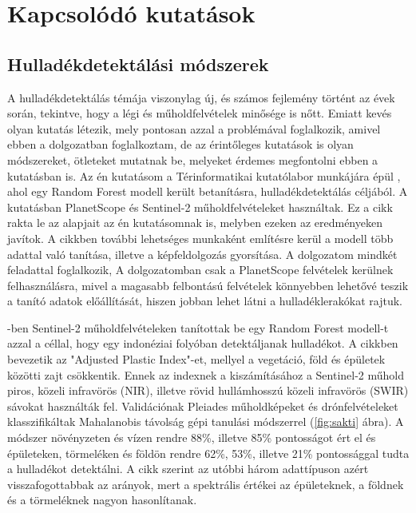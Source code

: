 \chapter{Kapcsolódó kutatások}
\label{ch:related_research}

\section{Hulladékdetektálási módszerek}
\label{ch:waste-detection-methods}

A hulladékdetektálás témája viszonylag új, és számos fejlemény történt az évek során, tekintve, hogy a légi és műholdfelvételek minősége is nőtt. Emiatt kevés olyan kutatás létezik, mely pontosan azzal a problémával foglalkozik, amivel ebben a dolgozatban foglalkoztam, de az érintőleges kutatások is olyan módszereket, ötleteket mutatnak be, melyeket érdemes megfontolni ebben a kutatásban is. Az én kutatásom a Térinformatikai kutatólabor munkájára épül \cite{magyar2023}, ahol egy Random Forest modell került betanításra, hulladékdetektálás céljából. A kutatásban PlanetScope és Sentinel-2 műholdfelvételeket használtak. Ez a cikk rakta le az alapjait az én kutatásomnak is, melyben ezeken az eredményeken javítok. A cikkben további lehetséges munkaként említésre kerül a modell több adattal való tanítása, illetve a képfeldolgozás gyorsítása. A dolgozatom mindkét feladattal foglalkozik, A dolgozatomban csak a PlanetScope felvételek kerülnek felhasználásra, mivel a magasabb felbontású felvételek könnyebben lehetővé teszik a tanító adatok előállítását, hiszen jobban lehet látni a hulladéklerakókat rajtuk.

\cite{sakti2023}-ben Sentinel-2 műholdfelvételeken tanítottak be egy Random Forest modell-t azzal a céllal, hogy egy indonéziai folyóban detektáljanak hulladékot. A cikkben bevezetik az "Adjusted Plastic Index"-et, mellyel a vegetáció, föld és épületek közötti zajt csökkentik. Ennek az indexnek a kiszámításához a Sentinel-2 műhold piros, közeli infravörös (NIR), illetve rövid hullámhosszú közeli infravörös (SWIR) sávokat használták fel. Validációnak Pleiades műholdképeket és drónfelvételeket klasszifikáltak Mahalanobis távolság gépi tanulási módszerrel (\ref{fig:sakti} ábra). A módszer növényzeten és vízen rendre 88\%, illetve 85\% pontosságot ért el és épületeken, törmeléken és földön rendre 62\%, 53\%, illetve 21\% pontossággal tudta a hulladékot detektálni. A cikk szerint az utóbbi három adattípuson azért visszafogottabbak az arányok, mert a spektrális értékei az épületeknek, a földnek és a törmeléknek nagyon hasonlítanak.

